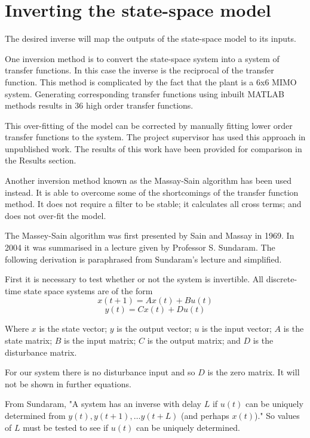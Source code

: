 \documentclass{report}
\begin{document}
\section{Inverting the state-space model}
\label{SSInverse}
The desired inverse will map the outputs of the state-space model to its inputs.

One inversion method is to convert the state-space system into a system of transfer functions. In this case the inverse is the reciprocal of the transfer function. This method is complicated by the fact that the plant is a 6x6 MIMO system. Generating corresponding transfer functions using inbuilt MATLAB methods results in 36 high order transfer functions.

This over-fitting of the model can be corrected by manually fitting lower order transfer functions to the system. The project supervisor has used this approach in unpublished work\cite{AndyModelErrors}. The results of this work have been provided for comparison in the Results section.

Another inversion method known as the Massay-Sain algorithm has been used instead. It is able to overcome some of the shortcomings of the transfer function method. It does not require a filter to be stable; it calculates all cross terms; and does not over-fit the model.

The Massey-Sain algorithm was first presented by Sain and Massay in 1969\cite{OGMassaySain}. In 2004 it was summarised in a lecture given by Professor S. Sundaram\cite{Sundaram}. The following derivation is paraphrased from Sundaram's lecture and simplified.

First it is necessary to test whether or not the system is invertible. All discrete-time state space systems are of the form
\begin{equation}
\label{definition1}
	x(t+1)=Ax(t)+Bu(t)
\end{equation}
\begin{equation}
\label{definition2}
	y(t)=Cx(t)+Du(t)
\end{equation}

Where $x$ is the state vector; $y$ is the output vector; $u$ is the input vector; $A$ is the state matrix; $B$ is the input matrix; $C$ is the output matrix; and $D$ is the disturbance matrix.

For our system there is no disturbance input and so $D$ is the zero matrix. It will not be shown in further equations.

From Sundaram,
"A system has an inverse with delay $L$ if $u(t)$ can be uniquely determined from $y(t),y(t+1),…y(t+L)$  (and perhaps $x(t)$)."\cite{Sundaram} So values of $L$ must be tested to see if $u(t)$ can be uniquely determined.
\end{document}
